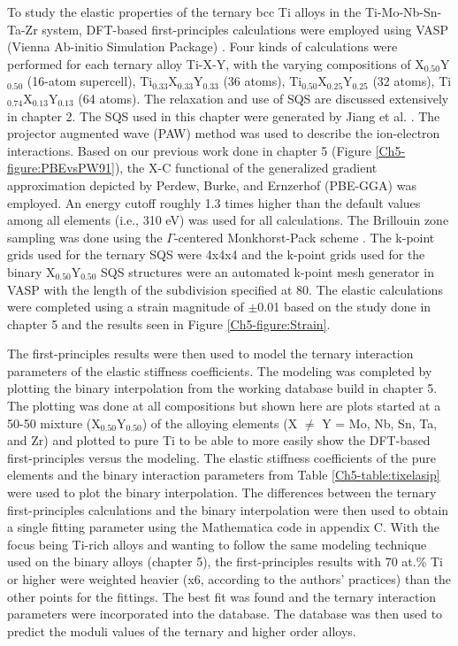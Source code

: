To study the elastic properties of the ternary bcc Ti alloys in the Ti-Mo-Nb-Sn-Ta-Zr system, DFT-based first-principles calculations were employed using VASP (Vienna Ab-initio Simulation Package) \cite{Kresse1996,Kresse1999}. Four kinds of calculations were performed for each ternary alloy Ti-X-Y, with the varying compositions of X$_{0.50}$Y$_{0.50}$ (16-atom supercell), Ti$_{0.33}$X$_{0.33}$Y$_{0.33}$ (36 atoms), Ti$_{0.50}$X$_{0.25}$Y$_{0.25}$ (32 atoms), Ti$_{0.74}$X$_{0.13}$Y$_{0.13}$ (64 atoms). The relaxation and use of SQS are discussed extensively in chapter 2. The SQS used in this chapter were generated by Jiang et al. \cite{Jiang2004,Jiang2009}. The projector augmented wave (PAW) method was used to describe the ion-electron interactions. Based on our previous work done in chapter 5 (Figure \ref{Ch5-figure:PBEvsPW91}), the X-C functional of the generalized gradient approximation depicted by Perdew, Burke, and Ernzerhof (PBE-GGA) \cite{Perdew1996a} was employed. An energy cutoff roughly 1.3 times higher than the default values among all elements (i.e., 310 eV) was used for all calculations. The Brillouin zone sampling was done using the $\Gamma$-centered Monkhorst-Pack scheme \cite{Monkhorst1976a}. The k-point grids used for the ternary SQS were 4x4x4 and the k-point grids used for the binary X$_{0.50}$Y$_{0.50}$ SQS structures were an automated k-point mesh generator in VASP with the length of the subdivision specified at 80. The elastic calculations were completed using a strain magnitude of $\pm$0.01 based on the study done in chapter 5 and the results seen in Figure \ref{Ch5-figure:Strain}.

The first-principles results were then used to model the ternary interaction parameters of the elastic stiffness coefficients. The modeling was completed by plotting the binary interpolation from the working database build in chapter 5. The plotting was done at all compositions but shown here are plots started at a 50-50 mixture (X$_{0.50}$Y$_{0.50}$) of the alloying elements (X $\neq$ Y = Mo, Nb, Sn, Ta, and Zr) and plotted to pure Ti to be able to more easily show the DFT-based first-principles versus the modeling. The elastic stiffness coefficients of the pure elements and the binary interaction parameters from Table \ref{Ch5-table:tixelasip} were used to plot the binary interpolation. The differences between the ternary first-principles calculations and the binary interpolation were then used to obtain a single fitting parameter using the Mathematica code in appendix C. With the focus being Ti-rich alloys and wanting to follow the same modeling technique used on the binary alloys (chapter 5), the first-principles results with 70 at.\% Ti or higher were weighted heavier (x6, according to the authors' practices) than the other points for the fittings. The best fit was found and the ternary interaction parameters were incorporated into the database. The database was then used to predict the moduli values of the ternary and higher order alloys. 

